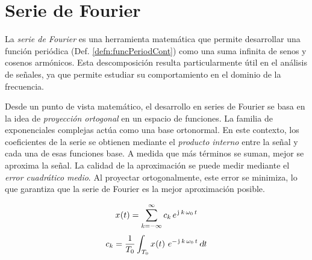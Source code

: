 \section{Serie de Fourier}

La \emph{serie de Fourier} es una herramienta matemática que permite desarrollar una función periódica (Def. \ref{defn:funcPeriodCont}) como una suma infinita de senos y cosenos armónicos.
Esta descomposición resulta particularmente útil en el análisis de señales, ya que permite estudiar su comportamiento en el dominio de la frecuencia.

Desde un punto de vista matemático, el desarrollo en series de Fourier se basa en la idea de \emph{proyección ortogonal} en un espacio de funciones.
La familia de exponenciales complejas actúa como una base ortonormal.
En este contexto, los coeficientes de la serie se obtienen mediante el \emph{producto interno} entre la señal y cada una de esas funciones base.
A medida que más términos se suman, mejor se aproxima la señal.
La calidad de la aproximación se puede medir mediante el \emph{error cuadrático medio}.
Al proyectar ortogonalmente, este error se minimiza, lo que garantiza que la serie de Fourier es la mejor aproximación posible.

\begin{mdframed}[style=DefinitionFrame]
    \begin{defn}
        \label{defn:FourierSerieExp}
    \end{defn}
    \[
        \fx[x]{t} = \sum_{\kth=-\infty}^\infty c_\kth \, e^{\iu \, \kth \, \omega_0 \, t}
    \]
    \[
        c_\kth = \frac{1}{T_0} \int_{T_0} \fx[x]{t} \, e^{-\iu \, \kth \, \omega_0 \, t} \, \dif t
    \]
\end{mdframed}

